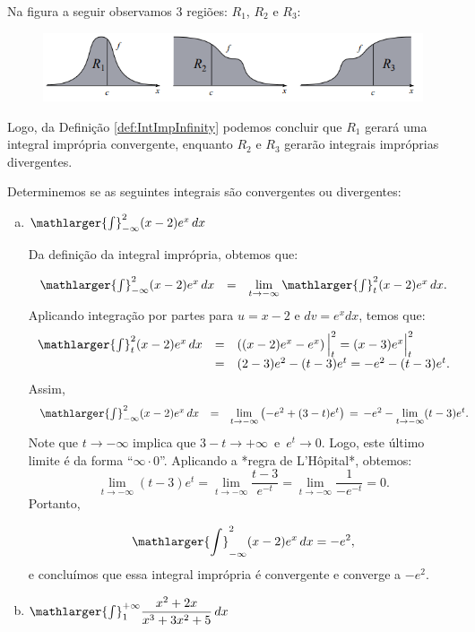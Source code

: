 \cleardoublepage\documentclass[../main.tex]{subfiles}
\begin{document}
Na figura a seguir observamos 3 regiões: \(R_1\), \(R_2\) e \(R_3\):
\begin{figure}[H]
    \centering
    \includegraphics[width=\linewidth]{figs/IntImpropriaInfinity.png}
    \label{fig:IntImpropriaInfinity}
\end{figure}
Logo, da Definição \ref{def:IntImpInfinity} podemos concluir que \(R_1\) gerará uma integral imprópria convergente, enquanto \(R_2\) e \(R_3\) gerarão integrais impróprias divergentes.
\begin{ex}
Determinemos se as seguintes integrais são convergentes ou divergentes:
\begin{enumerate}[a)]
\item \(\mathlarger{\int}^{2}_{-\infty} (x-2)e^x\,dx\)

\begin{solution}
Da definição da integral imprópria, obtemos que:

\[ \begin{array}{rcl} \mathlarger{\int}^{2}_{-\infty} (x-2)e^x\,dx &=& \lim\limits_{t\to -\infty}\mathlarger{\int}^{2}_{t} (x-2)e^x\,dx . \end{array} \] Aplicando integração por partes para $u=x-2$ e $dv=e^x dx$, temos que: \[ \begin{array}{rcl} \mathlarger{\int}^{2}_{t} (x-2)e^x\,dx &=& \left( (x-2)e^x -e^x \right)\Big{|}^{2}_{t}= (x-3)e^x\Big{|}^{2}_{t} \\ &=& (2-3)e^2 - (t-3)e^t = -e^2 - (t-3)e^t . \end{array} \] Assim, \[ \begin{array}{rcl} \mathlarger{\int}^{2}_{-\infty} (x-2)e^x\,dx &=& \lim\limits_{t\to -\infty} \left(-e^2 + (3-t)e^t \right) \,=\, -e^2 - \lim\limits_{t\to -\infty} (t-3)e^t . \end{array} \] Note que $t \to -\infty$ implica que $3-t \to + \infty\,$ e $\,e^t \to 0$. Logo, este último limite é da forma ``$\infty\cdot 0$''. Aplicando a *regra de L'Hôpital*, obtemos: \[ \lim\limits_{t\to -\infty} (t-3)e^t = \lim\limits_{t\to -\infty} \dfrac{t-3}{e^{-t}} = \lim\limits_{t\to -\infty} \dfrac{1}{-e^{-t}}=0. \]
Portanto,

\[ \mathlarger{\int}^{2}_{-\infty} (x-2)e^x\,dx=-e^2, \]
e concluímos que essa integral imprópria é convergente e converge a \(-e^2\).
\end{solution}
\item \(\mathlarger{\int}^{+\infty}_{1} \dfrac{x^2+2x}{x^3+3x^2+5}\,dx\)


\end{enumerate}
\end{ex}
\end{document}
